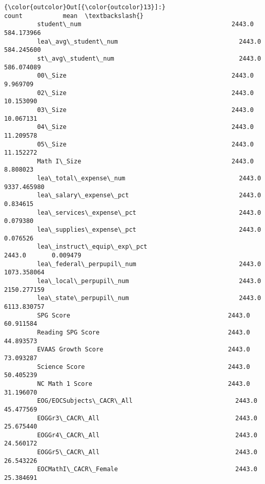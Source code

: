 \documentclass[11pt]{article}
\begin{document}
\begin{Verbatim}[commandchars=\\\{\}]
{\color{outcolor}Out[{\color{outcolor}13}]:}                                                      count           mean  \textbackslash{}
         student\_num                                         2443.0     584.173966   
         lea\_avg\_student\_num                                 2443.0     584.245600   
         st\_avg\_student\_num                                  2443.0     586.074089   
         00\_Size                                             2443.0       9.969709   
         02\_Size                                             2443.0      10.153090   
         03\_Size                                             2443.0      10.067131   
         04\_Size                                             2443.0      11.209578   
         05\_Size                                             2443.0      11.152272   
         Math I\_Size                                         2443.0       8.808023   
         lea\_total\_expense\_num                               2443.0    9337.465980   
         lea\_salary\_expense\_pct                              2443.0       0.834615   
         lea\_services\_expense\_pct                            2443.0       0.079380   
         lea\_supplies\_expense\_pct                            2443.0       0.076526   
         lea\_instruct\_equip\_exp\_pct                          2443.0       0.009479   
         lea\_federal\_perpupil\_num                            2443.0    1073.358064   
         lea\_local\_perpupil\_num                              2443.0    2150.277159   
         lea\_state\_perpupil\_num                              2443.0    6113.830757   
         SPG Score                                           2443.0      60.911584   
         Reading SPG Score                                   2443.0      44.893573   
         EVAAS Growth Score                                  2443.0      73.093287   
         Science Score                                       2443.0      50.405239   
         NC Math 1 Score                                     2443.0      31.196070   
         EOG/EOCSubjects\_CACR\_All                            2443.0      45.477569   
         EOGGr3\_CACR\_All                                     2443.0      25.675440   
         EOGGr4\_CACR\_All                                     2443.0      24.560172   
         EOGGr5\_CACR\_All                                     2443.0      26.543226   
         EOCMathI\_CACR\_Female                                2443.0      25.384691   

\end{Verbatim}
\end{document}
